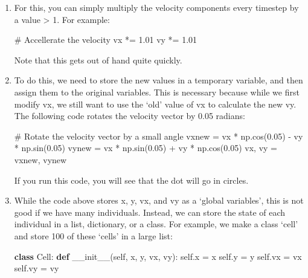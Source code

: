 \documentclass[
  letterpaper,
  DIV=11,
  numbers=noendperiod]{scrreprt}
\newenvironment{Shaded}{\begin{snugshade}}{\end{snugshade}}
\newcommand{\CommentTok}[1]{\textcolor[rgb]{0.37,0.37,0.37}{#1}}
\newcommand{\FloatTok}[1]{\textcolor[rgb]{0.68,0.00,0.00}{#1}}
\newcommand{\FunctionTok}[1]{\textcolor[rgb]{0.28,0.35,0.67}{#1}}
\newcommand{\KeywordTok}[1]{\textcolor[rgb]{0.00,0.23,0.31}{\textbf{#1}}}
\newcommand{\NormalTok}[1]{\textcolor[rgb]{0.00,0.23,0.31}{#1}}
\newcommand{\OperatorTok}[1]{\textcolor[rgb]{0.37,0.37,0.37}{#1}}
\newcommand{\VariableTok}[1]{\textcolor[rgb]{0.07,0.07,0.07}{#1}}
\theoremstyle{definition}
\theoremstyle{remark}
\begin{document}
\begin{enumerate}
\def\labelenumi{\alph{enumi}.}
\item
  For this, you can simply multiply the velocity components every
  timestep by a value \textgreater{} 1. For example:

\begin{Shaded}
\begin{Highlighting}[]
\CommentTok{\# Accellerate the velocity}
\NormalTok{vx }\OperatorTok{*=} \FloatTok{1.01}
\NormalTok{vy }\OperatorTok{*=} \FloatTok{1.01}
\end{Highlighting}
\end{Shaded}

  Note that this gets out of hand quite quickly.
\item
  To do this, we need to store the new values in a temporary variable,
  and then assign them to the original variables. This is necessary
  because while we first modify vx, we still want to use the `old' value
  of vx to calculate the new vy. The following code rotates the velocity
  vector by 0.05 radians:

\begin{Shaded}
\begin{Highlighting}[]
\CommentTok{\# Rotate the velocity vector by a small angle }
\NormalTok{vxnew }\OperatorTok{=}\NormalTok{ vx }\OperatorTok{*}\NormalTok{ np.cos(}\FloatTok{0.05}\NormalTok{) }\OperatorTok{{-}}\NormalTok{ vy }\OperatorTok{*}\NormalTok{ np.sin(}\FloatTok{0.05}\NormalTok{)}
\NormalTok{vynew }\OperatorTok{=}\NormalTok{ vx }\OperatorTok{*}\NormalTok{ np.sin(}\FloatTok{0.05}\NormalTok{) }\OperatorTok{+}\NormalTok{ vy }\OperatorTok{*}\NormalTok{ np.cos(}\FloatTok{0.05}\NormalTok{)}
\NormalTok{vx, vy }\OperatorTok{=}\NormalTok{ vxnew, vynew}
\end{Highlighting}
\end{Shaded}

  If you run this code, you will see that the dot will go in circles.
\item
  While the code above stores x, y, vx, and vy as a `global variables',
  this is not good if we have many individuals. Instead, we can store
  the state of each individual in a list, dictionary, or a class. For
  example, we make a class `cell' and store 100 of these `cells' in a
  large list:

\begin{Shaded}
\begin{Highlighting}[]
\KeywordTok{class}\NormalTok{ Cell:}
    \KeywordTok{def} \FunctionTok{\_\_init\_\_}\NormalTok{(}\VariableTok{self}\NormalTok{, x, y, vx, vy):}
        \VariableTok{self}\NormalTok{.x }\OperatorTok{=}\NormalTok{ x}
        \VariableTok{self}\NormalTok{.y }\OperatorTok{=}\NormalTok{ y}
        \VariableTok{self}\NormalTok{.vx }\OperatorTok{=}\NormalTok{ vx}
        \VariableTok{self}\NormalTok{.vy }\OperatorTok{=}\NormalTok{ vy}


\end{Highlighting}
\end{Shaded}
\end{enumerate}
\end{document}
